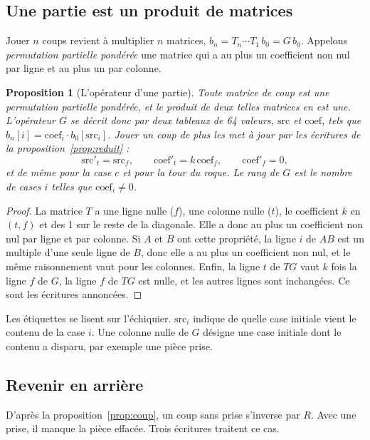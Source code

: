 \documentclass[11pt,a4paper]{article}
\theoremstyle{plain}
\newtheorem{proposition}{Proposition}
\begin{document}
\subsection{Une partie est un produit de matrices}\label{th:partie}
Jouer $n$ coups revient à multiplier $n$ matrices, $b_n = T_n \cdots T_1\, b_0 = G\, b_0$.
Appelons \emph{permutation partielle pondérée} une matrice qui a au plus un coefficient non nul
par ligne et au plus un par colonne.

\begin{proposition}[L'opérateur d'une partie]\label{prop:partie}
Toute matrice de coup est une permutation partielle pondérée, et le produit de deux telles
matrices en est une. L'opérateur $G$ se décrit donc par deux tableaux de 64 valeurs,
$\mathrm{src}$ et $\mathrm{coef}$, tels que $b_n[i] = \mathrm{coef}_i\cdot
b_0[\mathrm{src}_i]$. Jouer un coup de plus les met à jour par les écritures de la
proposition~\ref{prop:reduit} :
\[ \mathrm{src}'_t = \mathrm{src}_f,\qquad \mathrm{coef}'_t = k\,\mathrm{coef}_f,\qquad
\mathrm{coef}'_f = 0, \]
et de même pour la case $c$ et pour la tour du roque. Le rang de $G$ est le nombre de cases $i$
telles que $\mathrm{coef}_i \ne 0$.
\end{proposition}
\begin{proof}
La matrice $T$ a une ligne nulle ($f$), une colonne nulle ($t$), le coefficient $k$ en $(t, f)$
et des 1 sur le reste de la diagonale. Elle a donc au plus un coefficient non nul par ligne et par
colonne. Si $A$ et $B$ ont cette propriété, la ligne $i$ de $AB$ est un multiple d'une seule
ligne de $B$, donc elle a au plus un coefficient non nul, et le même raisonnement vaut pour les
colonnes. Enfin, la ligne $t$ de $TG$ vaut $k$ fois la ligne $f$ de $G$, la ligne $f$ de $TG$
est nulle, et les autres lignes sont inchangées. Ce sont les écritures annoncées.
\end{proof}

Les étiquettes se lisent sur l'échiquier. $\mathrm{src}_i$ indique de quelle case initiale vient
le contenu de la case $i$. Une colonne nulle de $G$ désigne une case initiale dont le contenu a
disparu, par exemple une pièce prise.

\subsection{Revenir en arrière}\label{th:retour}
D'après la proposition~\ref{prop:coup}, un coup sans prise s'inverse par $R$. Avec une prise, il
manque la pièce effacée. Trois écritures traitent ce cas.
\end{document}
